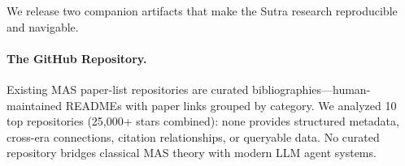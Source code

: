 \documentclass{article}
\begin{document}
%
%
%
%
%
%
%
%
%
%
%

We release two companion artifacts that make the Sutra research reproducible and
navigable.

\paragraph{The GitHub Repository.}
Existing MAS paper-list repositories are curated bibliographies---human-maintained
READMEs with paper links grouped by category. We analyzed 10 top repositories (25,000+
stars combined): none provides structured metadata, cross-era connections, citation
relationships, or queryable data. No curated repository bridges classical MAS theory
with modern LLM agent systems.
\end{document}
